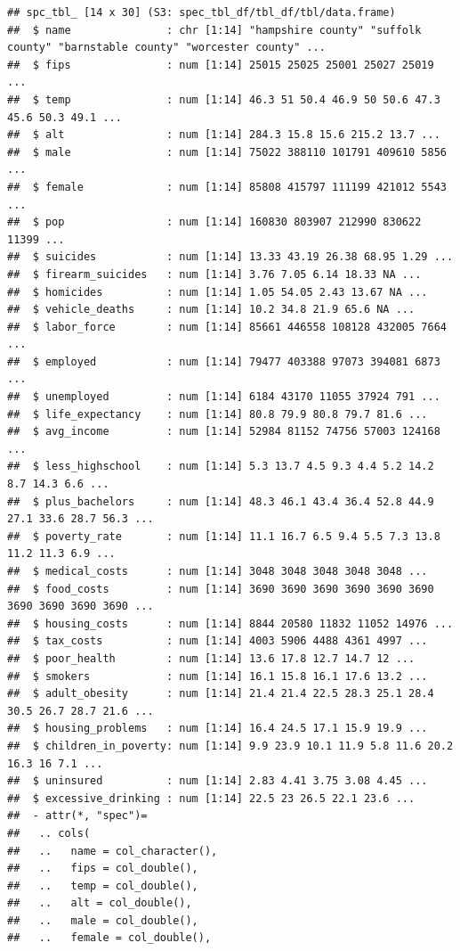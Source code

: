 \documentclass[
]{article}
\begin{document}
\begin{verbatim}
## spc_tbl_ [14 x 30] (S3: spec_tbl_df/tbl_df/tbl/data.frame)
##  $ name               : chr [1:14] "hampshire county" "suffolk county" "barnstable county" "worcester county" ...
##  $ fips               : num [1:14] 25015 25025 25001 25027 25019 ...
##  $ temp               : num [1:14] 46.3 51 50.4 46.9 50 50.6 47.3 45.6 50.3 49.1 ...
##  $ alt                : num [1:14] 284.3 15.8 15.6 215.2 13.7 ...
##  $ male               : num [1:14] 75022 388110 101791 409610 5856 ...
##  $ female             : num [1:14] 85808 415797 111199 421012 5543 ...
##  $ pop                : num [1:14] 160830 803907 212990 830622 11399 ...
##  $ suicides           : num [1:14] 13.33 43.19 26.38 68.95 1.29 ...
##  $ firearm_suicides   : num [1:14] 3.76 7.05 6.14 18.33 NA ...
##  $ homicides          : num [1:14] 1.05 54.05 2.43 13.67 NA ...
##  $ vehicle_deaths     : num [1:14] 10.2 34.8 21.9 65.6 NA ...
##  $ labor_force        : num [1:14] 85661 446558 108128 432005 7664 ...
##  $ employed           : num [1:14] 79477 403388 97073 394081 6873 ...
##  $ unemployed         : num [1:14] 6184 43170 11055 37924 791 ...
##  $ life_expectancy    : num [1:14] 80.8 79.9 80.8 79.7 81.6 ...
##  $ avg_income         : num [1:14] 52984 81152 74756 57003 124168 ...
##  $ less_highschool    : num [1:14] 5.3 13.7 4.5 9.3 4.4 5.2 14.2 8.7 14.3 6.6 ...
##  $ plus_bachelors     : num [1:14] 48.3 46.1 43.4 36.4 52.8 44.9 27.1 33.6 28.7 56.3 ...
##  $ poverty_rate       : num [1:14] 11.1 16.7 6.5 9.4 5.5 7.3 13.8 11.2 11.3 6.9 ...
##  $ medical_costs      : num [1:14] 3048 3048 3048 3048 3048 ...
##  $ food_costs         : num [1:14] 3690 3690 3690 3690 3690 3690 3690 3690 3690 3690 ...
##  $ housing_costs      : num [1:14] 8844 20580 11832 11052 14976 ...
##  $ tax_costs          : num [1:14] 4003 5906 4488 4361 4997 ...
##  $ poor_health        : num [1:14] 13.6 17.8 12.7 14.7 12 ...
##  $ smokers            : num [1:14] 16.1 15.8 16.1 17.6 13.2 ...
##  $ adult_obesity      : num [1:14] 21.4 21.4 22.5 28.3 25.1 28.4 30.5 26.7 28.7 21.6 ...
##  $ housing_problems   : num [1:14] 16.4 24.5 17.1 15.9 19.9 ...
##  $ children_in_poverty: num [1:14] 9.9 23.9 10.1 11.9 5.8 11.6 20.2 16.3 16 7.1 ...
##  $ uninsured          : num [1:14] 2.83 4.41 3.75 3.08 4.45 ...
##  $ excessive_drinking : num [1:14] 22.5 23 26.5 22.1 23.6 ...
##  - attr(*, "spec")=
##   .. cols(
##   ..   name = col_character(),
##   ..   fips = col_double(),
##   ..   temp = col_double(),
##   ..   alt = col_double(),
##   ..   male = col_double(),
##   ..   female = col_double(),

\end{verbatim}
\end{document}
